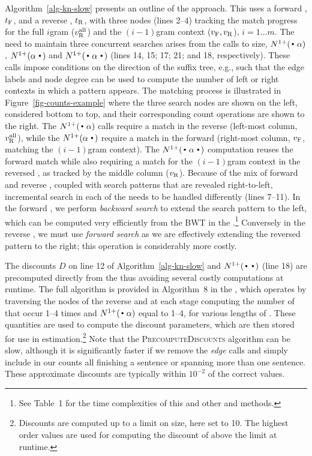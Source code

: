 Algorithm~\ref{alg-kn-slow} presents an outline of the approach.
This uses a forward \CST, $t_{\text{F}}$, and a reverse \CST, $t_{\text{R}}$, with three \CST nodes (lines 2--4) tracking the match progress for the full $i$gram ($v_{\text{R}}^{\text{all}}$) and the $(i-1)$gram context ($v_{\text{F}}, v_{\text{R}}$), $i=1 \ldots m$.
The need to maintain three concurrent searches arises from the calls to size, $\nlplus{\dotpat}$, $\nlplus{\patdot}$ and $\nlplus{\dotpatdot}$ (lines 14, 15; 17; 21; and 18, respectively).
These calls impose conditions on the direction of the suffix tree, e.g., such that the edge 
labels and node degree can be used to compute the number of left or right contexts in which a pattern appears. 
The matching process is illustrated in Figure~\ref{fig-counts-example} where the three search nodes are shown on the left, considered bottom to top, and their corresponding count operations are shown to the right.
The $\nlplus{\dotpat}$ calls require a match in the reverse \CST (left-most column, $v_{\text{R}}^{\text{all}}$), while the $\nlplus{\patdot}$ require a match in the forward \CST (right-most column, $v_{\text{F}}$, matching the $(i-1)$gram context). 
The $\nlplus{\dotpatdot}$ computation reuses the forward match while also requiring a match for the $(i-1)$gram context in the reversed \CST, as tracked by the middle column ($v_{\text{R}}$).
Because of the mix of forward and reverse \CSTs, coupled with search patterns that are revealed right-to-left, incremental search in each of the \CSTs needs to be handled differently (lines 7--11).
In the forward \CST, we perform \emph{backward search} to extend the search pattern to the left, which can be computed very efficiently from the BWT in the \CSA.\footnote{See \supp Table~1 for the time complexities of this and other \CSA and \CST methods.}
Conversely in the reverse \CST, we must use \emph{forward search} as we are effectively extending the reversed pattern to the right; this operation is considerably more costly.

The discounts $D$ on line 12 of Algorithm~\ref{alg-kn-slow} and $\nlplus{\Bigcdot\Bigcdot}$ (line 18) are precomputed directly from the \CSTs thus avoiding several costly computations at runtime. 
The full algorithm is provided in Algorithm~8 in the \supp, which operates by traversing the nodes of the reverse \CST and at each stage computing the number of \ngrams that occur 1--4 times and $\nlplus{\dotpat}$ equal to 1--4, for various lengths of \ngrams.
These quantities are used to compute the discount parameters, which are then stored for use in estimation.\footnote{Discounts are computed up to a limit on \ngram size, here set to 10. The highest order values are used for computing the discount of \ngrams above the limit at runtime.}
Note that the \textsc{PrecomputeDiscounts} algorithm can be slow, although it is significantly faster if we remove the \emph{edge} calls and simply include in our counts all \ngrams finishing a sentence or spanning more than one sentence. 
These approximate discounts are typically within $10^{-2}$ of the correct values.

